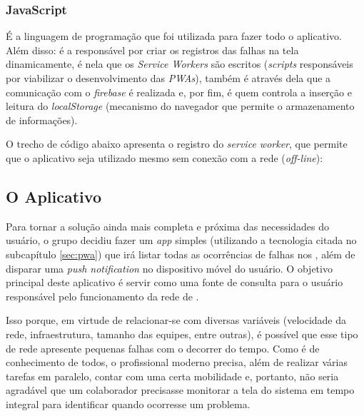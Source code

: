 \subsubsection{JavaScript}
\label{subsubsec:javascript}

É a linguagem de programação que foi utilizada para fazer todo o aplicativo. Além disso: é a responsável por criar os registros das falhas na tela dinamicamente, é nela que os \textit{Service Workers} são escritos (\textit{scripts} responsáveis por viabilizar o desenvolvimento das \textit{PWAs}), também é através dela que a comunicação com o \textit{firebase} é realizada e, por fim, é quem controla a inserção e leitura do \textit{localStorage} (mecanismo do navegador que permite o armazenamento de informações).

O trecho de código abaixo apresenta o registro do \textit{service worker}, que permite que o aplicativo seja utilizado mesmo sem conexão com a rede (\textit{off-line}):

\vspace*{1cm}
\begin{python}
    if ('serviceWorker' in navigator) {
        navigator.serviceWorker
            .register('service-worker.js')
            .then(reg => console.log("[ServiceWorker] Registered..."))
            [ . . .]
\end{python}
\vspace*{1cm}



\subsection{O Aplicativo}
\label{subsec:o_aplicativo}

Para tornar a solução ainda mais completa e próxima das necessidades do usuário, o grupo decidiu fazer um \textit{app} simples (utilizando a tecnologia citada no subcapítulo \ref{sec:pwa}) que irá listar todas as ocorrências de falhas nos \containers{}, além de disparar uma \textit{push notification} no dispositivo móvel do usuário. O objetivo principal deste aplicativo é servir como uma fonte de consulta para o usuário responsável pelo funcionamento da rede de \containers{}.

Isso porque, em virtude de relacionar-se com diversas variáveis (velocidade da rede, infraestrutura, tamanho das equipes, entre outras), é possível que esse tipo de rede apresente pequenas falhas com o decorrer do tempo. Como é de conhecimento de todos, o profissional moderno precisa, além de realizar várias tarefas em paralelo, contar com uma certa mobilidade e, portanto, não seria agradável que um colaborador precisasse monitorar a tela do sistema em tempo integral para identificar quando ocorresse um problema.

